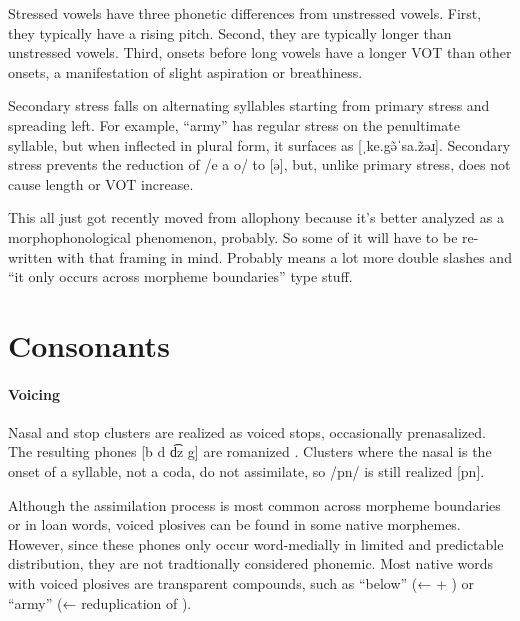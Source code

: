 Stressed vowels have three phonetic differences from unstressed vowels. First, they typically have a rising pitch. Second, they are typically longer than unstressed vowels. Third, onsets before long vowels have a longer VOT than other onsets, a manifestation of slight aspiration or breathiness.

Secondary stress falls on alternating syllables starting from primary stress and spreading left. For example,  “army” has regular stress on the penultimate syllable, but when inflected in plural form, it surfaces as  [ˌke.gə̃ˈsa.z̃əɹ]. Secondary stress prevents the reduction of /e a o/ to [ə], but, unlike primary stress, does not cause length or VOT increase.

\begin{kaobox}[frametitle=\sc todo:]
This all just got recently moved from allophony because it's better analyzed as a morphophonological phenomenon, probably. So some of it will have to be re-written with that framing in mind. Probably means a lot more double slashes and “it only occurs across morpheme boundaries” type stuff.
\end{kaobox}
\section{Consonants}
\paragraph{Voicing}
Nasal and stop clusters are realized as voiced stops, occasionally prenasalized. The resulting phones [b d d͡z g] are romanized .  Clusters where the nasal is the onset of a syllable, not a coda, do not assimilate, so /pn/ is still realized [pn]. 

Although the assimilation process is most common across morpheme boundaries or in loan words, voiced plosives can be found in some native morphemes. However, since these phones only occur word-medially in limited and predictable distribution, they are not tradtionally considered phonemic.  Most native words with voiced plosives are transparent compounds, such as  “below” (←  + ) or  “army” (← reduplication of ).


